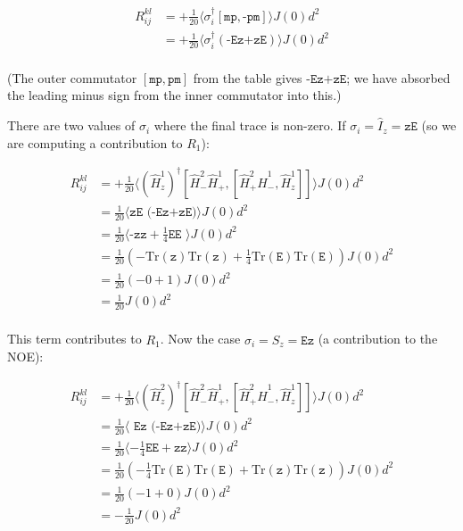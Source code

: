 \documentclass[notitlepage,11pt]{article}
\begin{document}
\begin{equation}
\begin{array}{rl}
  R_{ij}^{kl}
  &= +\frac{1}{20}\langle \sigma_i^\dagger [\texttt{mp},\texttt{-pm}] \rangle J\left(0\right)d^2 \\
  &= +\frac{1}{20}\langle \sigma_i^\dagger (\texttt{-Ez+zE})\rangle J\left(0\right)d^2 \\
\end{array}
\end{equation}

(The outer commutator $[\texttt{mp},\texttt{pm}]$ from the table gives $\texttt{-Ez+zE}$; we have absorbed the leading minus sign from the inner commutator into this.)

There are two values of $\sigma_i$ where the final trace is non-zero. If $\sigma_i=\hat{I}_z=\texttt{zE}$ (so we are computing a contribution to $R_1$):

\begin{equation}
\begin{array}{rl}
  R_{ij}^{kl}&= +\frac{1}{20}\langle (\hat{H}^1_z)^{\dagger} [\hat{H}^2_- \hat{H}^1_+ ,[\hat{H}^2_+ \hat{H}^1_- ,\hat{H}^1_z]] \rangle J\left(0\right)d^2 \\
  &= \frac{1}{20}\langle \texttt{zE (-Ez+zE)} \rangle J\left(0\right)d^2 \\
  &= \frac{1}{20}\langle \texttt{-zz} + \frac{1}{4}\texttt{EE }\rangle J\left(0\right)d^2 \\
  &= \frac{1}{20}\left( -\mathrm{Tr}(\texttt{z})\mathrm{Tr}(\texttt{z}) + \frac{1}{4}\mathrm{Tr}(\texttt{E})\mathrm{Tr}(\texttt{E}) \right) J\left(0\right)d^2 \\
  &= \frac{1}{20}\left(- 0 + 1\right) J\left(0\right)d^2 \\
  &= \frac{1}{20} J\left(0\right)d^2 \\
\end{array}
\end{equation}


This term contributes to $R_1$. Now the case $\sigma_i=\hat{S}_z=\texttt{Ez}$ (a contribution to the NOE):

\begin{equation}
\begin{array}{rl}
  R_{ij}^{kl}&= +\frac{1}{20}\langle (\hat{H}^2_z)^{\dagger} [\hat{H}^2_- \hat{H}^1_+ ,[\hat{H}^2_+ \hat{H}^1_- ,\hat{H}^1_z]] \rangle J\left(0\right)d^2 \\
  &= \frac{1}{20}\langle \texttt{ Ez (-Ez+zE)} \rangle J\left(0\right)d^2 \\
  &= \frac{1}{20}\langle -\frac{1}{4}\texttt{EE} + \texttt{zz} \rangle J\left(0\right)d^2 \\
  &= \frac{1}{20}\left( - \frac{1}{4}\mathrm{Tr}(\texttt{E})\mathrm{Tr}(\texttt{E}) + \mathrm{Tr}(\texttt{z})\mathrm{Tr}(\texttt{z})  \right) J\left(0\right)d^2 \\
  &= \frac{1}{20}\left( -1 + 0\right) J\left(0\right)d^2 \\
  &= -\frac{1}{20} J\left(0\right)d^2 \\
\end{array}
\end{equation}
\end{document}
